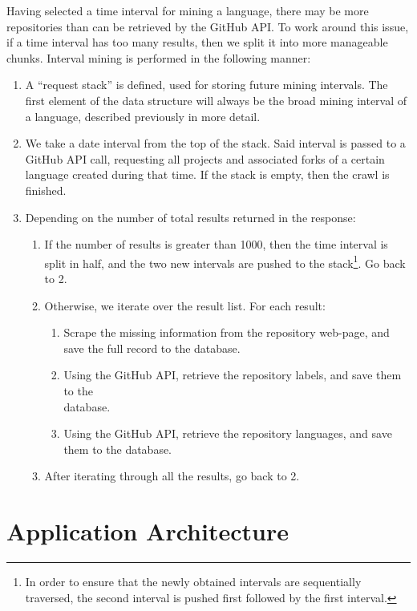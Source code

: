 Having selected a time interval for mining a language, there may be more repositories than can be retrieved by the GitHub API\@.
To work around this issue, if a time interval has too many results, then we split it into more manageable chunks.
Interval mining is performed in the following manner:
\begin{enumerate}
    \item A ``request stack'' is defined, used for storing future mining intervals. The first element of the data structure will always be the broad mining interval of a language, described previously in more detail.
    \item We take a date interval from the top of the stack. Said interval is passed to a GitHub API call, requesting all projects and associated forks of a certain language created during that time. If the stack is empty, then the crawl is finished.
    \item Depending on the number of total results returned in the response:
    \begin{enumerate}
        \item If the number of results is greater than 1000, then the time interval is split in half, and the two new intervals are pushed to the stack\footnote{In order to ensure that the newly obtained intervals are sequentially traversed, the second interval is pushed first followed by the first interval.}. Go back to 2.
        \item Otherwise, we iterate over the result list. For each result:
        \begin{enumerate}
            \item Scrape the missing information from the repository web-page, and save the full record to the database.
            \item Using the GitHub API, retrieve the repository labels, and save them to the
            \\database.
            \item Using the GitHub API, retrieve the repository languages, and save them to the database.
        \end{enumerate}
        \item After iterating through all the results, go back to 2.
    \end{enumerate}
\end{enumerate}

\newpage
\section{Application Architecture}

